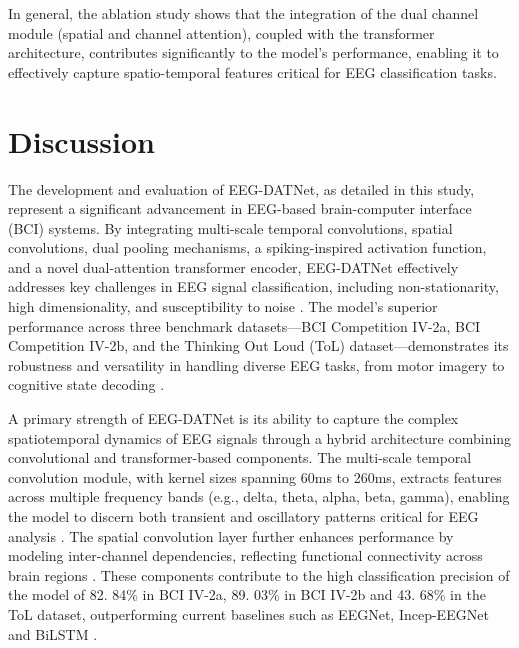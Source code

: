 \documentclass[pdflatex,sn-mathphys-num]{sn-jnl}%
\theoremstyle{thmstyleone}%
\theoremstyle{thmstyletwo}%
\theoremstyle{thmstylethree}%
\begin{document}
In general, the ablation study shows that the integration of the dual channel module (spatial and channel attention), coupled with the transformer architecture, contributes significantly to the model’s performance, enabling it to effectively capture spatio-temporal features critical for EEG classification tasks.

\section{Discussion}

The development and evaluation of EEG-DATNet, as detailed in this study, represent a significant advancement in EEG-based brain-computer interface (BCI) systems. By integrating multi-scale temporal convolutions, spatial convolutions, dual pooling mechanisms, a spiking-inspired activation function, and a novel dual-attention transformer encoder, EEG-DATNet effectively addresses key challenges in EEG signal classification, including non-stationarity, high dimensionality, and susceptibility to noise \cite{lotte2018review}. The model’s superior performance across three benchmark datasets—BCI Competition IV-2a, BCI Competition IV-2b, and the Thinking Out Loud (ToL) dataset—demonstrates its robustness and versatility in handling diverse EEG tasks, from motor imagery to cognitive state decoding \cite{tangermann2012review, leeb2008graz2b, nieto2022thinking}.

A primary strength of EEG-DATNet is its ability to capture the complex spatiotemporal dynamics of EEG signals through a hybrid architecture combining convolutional and transformer-based components. The multi-scale temporal convolution module, with kernel sizes spanning 60ms to 260ms, extracts features across multiple frequency bands (e.g., delta, theta, alpha, beta, gamma), enabling the model to discern both transient and oscillatory patterns critical for EEG analysis \cite{schirrmeister2017deep}. The spatial convolution layer further enhances performance by modeling inter-channel dependencies, reflecting functional connectivity across brain regions \cite{lawhern2018eegnet}. These components contribute to the high classification precision of the model of 82. 84\% in BCI IV-2a, 89. 03\% in BCI IV-2b and 43. 68\% in the ToL dataset, outperforming current baselines such as EEGNet, Incep-EEGNet and BiLSTM \cite{lawhern2018eegnet, zhang2020inception, Gasparini2022InnerSpeech}.
\end{document}
